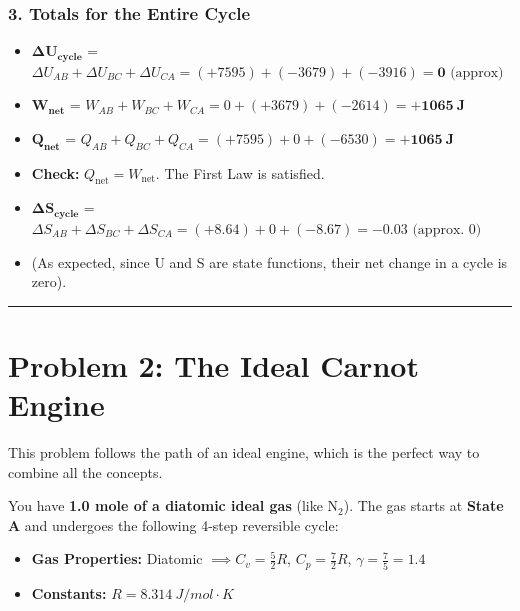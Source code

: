 \documentclass[article]{article}
\begin{document}
\subsubsection{3. Totals for the Entire Cycle}
\begin{itemize}
    \item $\mathbf{\Delta U_{\text{cycle}}}$ = $\Delta U_{AB} + \Delta U_{BC} + \Delta U_{CA} = (+7595) + (-3679) + (-3916) = \mathbf{0} \text{ (approx)}$
    \item $\mathbf{W_{\text{net}}}$ = $W_{AB} + W_{BC} + W_{CA} = 0 + (+3679) + (-2614) = \mathbf{+\SI{1065}{J}}$
    \item $\mathbf{Q_{\text{net}}}$ = $Q_{AB} + Q_{BC} + Q_{CA} = (+7595) + 0 + (-6530) = \mathbf{+\SI{1065}{J}}$
    \item \textbf{Check:} $Q_{\text{net}} = W_{\text{net}}$. The First Law is satisfied.
    \item $\mathbf{\Delta S_{\text{cycle}}}$ = $\Delta S_{AB} + \Delta S_{BC} + \Delta S_{CA} = (+8.64) + 0 + (-8.67) = \mathbf{-0.03} \text{ (approx. 0)}$
    \item (As expected, since U and S are state functions, their net change in a cycle is zero).
\end{itemize}

\hrule

\section{Problem 2: The Ideal Carnot Engine}
This problem follows the path of an ideal engine, which is the perfect way to combine all the concepts.

You have \textbf{1.0 mole of a diatomic ideal gas} (like N$_2$). The gas starts at \textbf{State A} and undergoes the following 4-step reversible cycle:
\begin{itemize}
    \item \textbf{Gas Properties:} Diatomic $\implies C_v = \frac{5}{2}R$, $C_p = \frac{7}{2}R$, $\gamma = \frac{7}{5} = 1.4$
    \item \textbf{Constants:} $R = \SI{8.314}{J/mol\cdot K}$
\end{itemize}

\centering
{}
\end{document}
